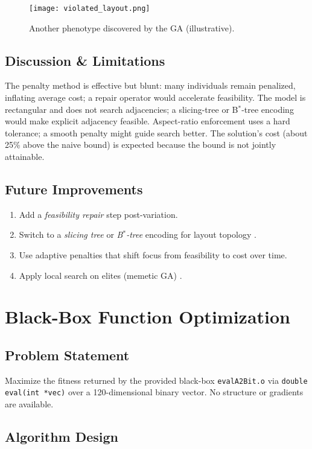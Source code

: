 \documentclass{article}
\begin{document}
\begin{figure}[H]
    \centering
    \texttt{[image: violated\_layout.png]}
    \caption{Another phenotype discovered by the GA (illustrative).}
\end{figure}

\subsection{Discussion \& Limitations}
The penalty method is effective but blunt: many individuals remain penalized, inflating average cost; a repair operator would accelerate feasibility. The model is rectangular and does not search adjacencies; a slicing-tree or B$^\ast$-tree encoding would make explicit adjacency feasible. Aspect-ratio enforcement uses a hard tolerance; a smooth penalty might guide search better. The solution’s cost (about 25\% above the naive bound) is expected because the bound is not jointly attainable.

\subsection{Future Improvements}
\begin{enumerate}
    \item Add a \emph{feasibility repair} step post-variation.
    \item Switch to a \emph{slicing tree} or \emph{B$^\ast$-tree} encoding for layout topology \cite{murata1996sequencepair,chang2000bstar}.
    \item Use adaptive penalties that shift focus from feasibility to cost over time.
    \item Apply local search on elites (memetic GA) \cite{moscato1999ma}.
\end{enumerate}

\section{Black-Box Function Optimization}
\subsection{Problem Statement}
Maximize the fitness returned by the provided black-box \texttt{evalA2Bit.o} via \texttt{double eval(int *vec)} over a 120-dimensional binary vector. No structure or gradients are available.

\subsection{Algorithm Design}
\end{document}
